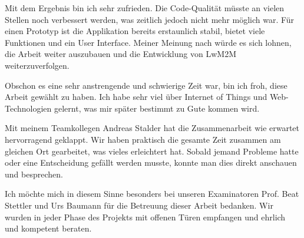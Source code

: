 Mit dem Ergebnis bin ich sehr zufrieden. Die Code-Qualität müsste an vielen Stellen noch verbessert werden, was zeitlich jedoch nicht mehr möglich war. Für einen Prototyp ist die Applikation bereits erstaunlich stabil, bietet viele Funktionen und ein User Interface. Meiner Meinung nach würde es sich lohnen, die Arbeit weiter auszubauen und die Entwicklung von LwM2M weiterzuverfolgen.

Obschon es eine sehr anstrengende und schwierige Zeit war, bin ich froh, diese Arbeit gewählt zu haben. Ich habe sehr viel über Internet of Things und Web-Technologien gelernt, was mir später bestimmt zu Gute kommen wird.

Mit meinem Teamkollegen Andreas Stalder hat die Zusammenarbeit wie erwartet hervorragend geklappt. Wir haben praktisch die gesamte Zeit zusammen am gleichen Ort gearbeitet, was vieles erleichtert hat. Sobald jemand Probleme hatte oder eine Entscheidung gefällt werden musste, konnte man dies direkt anschauen und besprechen. 

Ich möchte mich in diesem Sinne besonders bei unseren Examinatoren Prof. Beat Stettler und Urs Baumann für die Betreuung dieser Arbeit bedanken. Wir wurden in jeder Phase des Projekts mit offenen Türen empfangen und ehrlich und kompetent beraten.